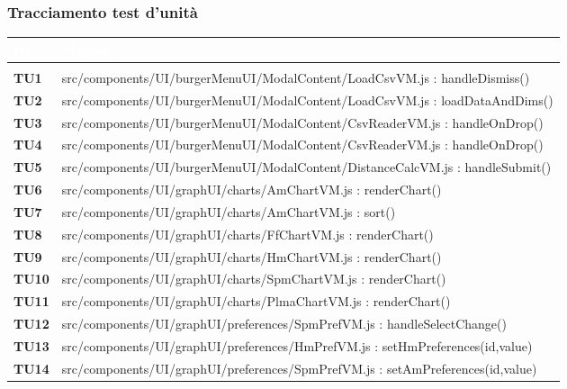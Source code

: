 \subsubsection{Tracciamento test d'unità}

{

\renewcommand{\arraystretch}{1.5}
\renewcommand\extrarowheight{1.5pt}
\setlength\arrayrulewidth{1pt}
\begin{longtable}{C{1.1cm} | L{15cm}} 
		\textcolor{white}{\textbf{ID}} & 
		\textcolor{white}{\textbf{Metodo}} \\
		\endfirsthead
		\\
	    \endfoot
	    \endlastfoot
	  		
		\textbf{TU1} & src/components/UI/burgerMenuUI/ModalContent/LoadCsvVM.js : handleDismiss()\\
		\textbf{TU2} & src/components/UI/burgerMenuUI/ModalContent/LoadCsvVM.js : loadDataAndDims()\\
		\textbf{TU3} & src/components/UI/burgerMenuUI/ModalContent/CsvReaderVM.js : handleOnDrop()\\
		\textbf{TU4} & src/components/UI/burgerMenuUI/ModalContent/CsvReaderVM.js : handleOnDrop()\\
		\textbf{TU5} & src/components/UI/burgerMenuUI/ModalContent/DistanceCalcVM.js : handleSubmit()\\
		\textbf{TU6} & src/components/UI/graphUI/charts/AmChartVM.js : renderChart()\\
		\textbf{TU7} & src/components/UI/graphUI/charts/AmChartVM.js : sort()\\
		\textbf{TU8} & src/components/UI/graphUI/charts/FfChartVM.js : renderChart()\\
		\textbf{TU9} & src/components/UI/graphUI/charts/HmChartVM.js : renderChart()\\
		\textbf{TU10} & src/components/UI/graphUI/charts/SpmChartVM.js : renderChart()\\
		\textbf{TU11} & src/components/UI/graphUI/charts/PlmaChartVM.js : renderChart()\\
		\textbf{TU12} & src/components/UI/graphUI/preferences/SpmPrefVM.js : handleSelectChange()\\
		\textbf{TU13} & src/components/UI/graphUI/preferences/HmPrefVM.js : setHmPreferences(id,value)\\
	\textbf{TU14} & src/components/UI/graphUI/preferences/SpmPrefVM.js : setAmPreferences(id,value)\\	

\end{longtable}}
